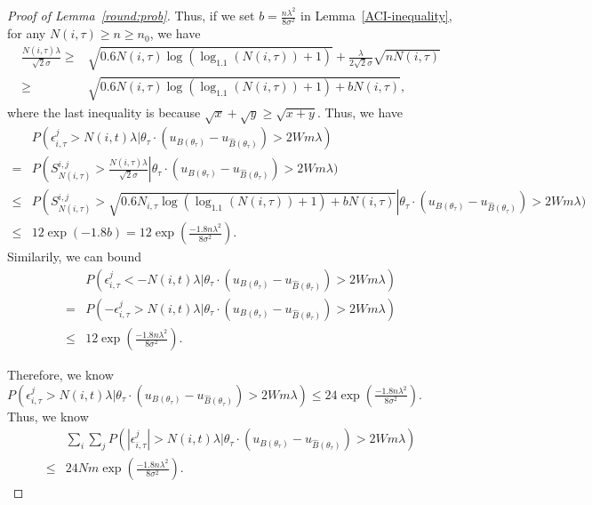 \documentclass{article}
\begin{document}
\begin{proof}[Proof of Lemma~\ref{round:prob}]
Thus, if we set $b=\frac{n\lambda^2}{8\sigma^2}$ in Lemma~\ref{ACI-inequality}, for any $N(i,\tau)\geq n\geq n_{0}$, we have
\begin{align}
\frac{N(i,\tau)\lambda}{\sqrt{2}\sigma}\geq & \sqrt{0.6N(i,\tau)\log(\log_{1.1}(N(i,\tau))+1)}+\frac{\lambda}{2\sqrt{2}\sigma}\sqrt{n N(i,\tau)} \nonumber \\
\geq & \sqrt{0.6N(i,\tau)\log(\log_{1.1}(N(i,\tau))+1)+bN(i,\tau)}, \nonumber 
\end{align}
where the last inequality is because $\sqrt{x}+\sqrt{y}\geq \sqrt{x+y}$. Thus, we have
\begin{align}
&P(\epsilon_{i,\tau}^{j}>N(i,t)\lambda|\theta_{\tau}\cdot(u_{B(\theta_{\tau})}-u_{\hat{B}(\theta_{\tau})})> 2Wm\lambda) \nonumber \\
=&P\left(S_{N(i,\tau)}^{i,j}>\frac{N(i,\tau)\lambda}{\sqrt{2}\sigma}\right|\theta_{\tau}\cdot(u_{B(\theta_{\tau})}-u_{\hat{B}(\theta_{\tau})})> 2Wm\lambda) \nonumber \\
\leq & P\left(S_{N(i,\tau)}^{i,j}> \sqrt{0.6 N_{i,\tau}\log(\log_{1.1}(N(i,\tau))+1)+b N(i,\tau)}\right|\theta_{\tau}\cdot(u_{B(\theta_{\tau})}-u_{\hat{B}(\theta_{\tau})})> 2Wm\lambda) \nonumber \\
\leq & 12\exp( -1.8b) = 12\exp\left(\frac{-1.8 n\lambda^2}{8\sigma^2}\right). \nonumber
\end{align}
Similarily, we can bound 
\begin{align}
&P(\epsilon_{i,\tau}^{j}<-N(i,t)\lambda|\theta_{\tau}\cdot(u_{B(\theta_{\tau})}-u_{\hat{B}(\theta_{\tau})})> 2Wm\lambda) \nonumber \\
=&P(-\epsilon_{i,\tau}^{j}>N(i,t)\lambda|\theta_{\tau}\cdot(u_{B(\theta_{\tau})}-u_{\hat{B}(\theta_{\tau})})> 2Wm\lambda) \nonumber \\
\leq & 12\exp\left(\frac{-1.8 n\lambda^2}{8\sigma^2}\right). \nonumber 
\end{align}

Therefore, we know $P(\epsilon_{i,\tau}^{j}>N(i,t)\lambda|\theta_{\tau}\cdot(u_{B(\theta_{\tau})}-u_{\hat{B}(\theta_{\tau})})> 2Wm\lambda)\leq 24\exp\left(\frac{-1.8 n\lambda^2}{8\sigma^2}\right)$. Thus, we know
\begin{align}
&\sum_{i}\sum_{j} P(|\epsilon_{i,\tau}^{j}|>N(i,t)\lambda|\theta_{\tau}\cdot(u_{B(\theta_{\tau})}-u_{\hat{B}(\theta_{\tau})})> 2Wm\lambda)  \nonumber \\
\leq& 24Nm \exp\left(\frac{-1.8 n\lambda^2}{8\sigma^2}\right). \nonumber
\end{align}

\end{proof}
\end{document}
